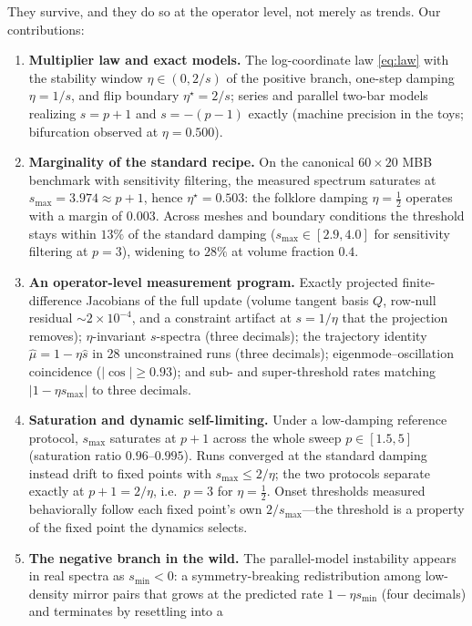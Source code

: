 \documentclass[11pt,a4paper]{article}
\newcommand{\smax}{s_{\max}}
\newcommand{\smin}{s_{\min}}
\newcommand{\etastar}{\eta^{\star}}
\begin{document}
They survive, and they do so at the operator level, not merely as trends.
Our contributions:

\begin{enumerate}
\item \textbf{Multiplier law and exact models.} The log-coordinate law
  \eqref{eq:law} with the stability window $\eta\in(0,2/s)$ of the positive
  branch, one-step damping $\eta=1/s$, and flip boundary $\etastar=2/s$;
  series and parallel two-bar models realizing $s=p{+}1$ and $s=-(p{-}1)$
  exactly (machine precision in the toys; bifurcation observed at
  $\eta=0.500$).
\item \textbf{Marginality of the standard recipe.} On the canonical
  $60\times20$ MBB benchmark with sensitivity filtering, the measured
  spectrum saturates at $\smax=3.974\approx p{+}1$, hence
  $\etastar=0.503$: the folklore damping $\eta=\tfrac12$ operates with a
  margin of $0.003$. Across meshes and boundary conditions the threshold
  stays within $13\%$ of the standard damping ($\smax\in[2.9,4.0]$ for
  sensitivity filtering at $p=3$), widening to $28\%$ at volume fraction
  $0.4$.
\item \textbf{An operator-level measurement program.} Exactly projected
  finite-difference Jacobians of the full update (volume tangent basis $Q$,
  row-null residual $\sim2\times10^{-4}$, and a constraint artifact at
  $s=1/\eta$ that the projection removes); $\eta$-invariant $s$-spectra
  (three decimals); the trajectory identity $\hat\mu=1-\eta\hat s$ in 28
  unconstrained runs (three decimals); eigenmode--oscillation coincidence
  ($|\cos|\ge0.93$); and sub- and super-threshold rates matching
  $|1-\eta\smax|$ to three decimals.
\item \textbf{Saturation and dynamic self-limiting.} Under a low-damping
  reference protocol, $\smax$ saturates at $p{+}1$ across the whole sweep
  $p\in[1.5,5]$ (saturation ratio $0.96$--$0.995$). Runs converged at the
  standard damping instead drift to fixed points with $\smax\le2/\eta$;
  the two protocols separate exactly at $p{+}1=2/\eta$, i.e.\ $p=3$ for
  $\eta=\tfrac12$. Onset thresholds measured behaviorally follow each fixed
  point's own $2/\smax$---the threshold is a property of the fixed point
  the dynamics selects.
\item \textbf{The negative branch in the wild.} The parallel-model
  instability appears in real spectra as $\smin<0$: a symmetry-breaking
  redistribution among low-density mirror pairs that grows at the predicted
  rate $1-\eta\smin$ (four decimals) and terminates by resettling into a

\end{enumerate}
\end{document}

